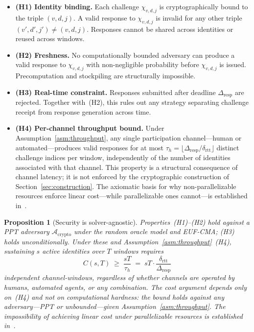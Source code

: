 \documentclass[11pt]{article}
\newtheorem{proposition}{Proposition}
\theoremstyle{remark}
\theoremstyle{plain}
\begin{document}
	\begin{itemize}
		\item \textbf{(H1) Identity binding.} Each challenge $\chi_{v,d,j}$
		is cryptographically bound to the triple $(v,d,j)$. A valid response
		to $\chi_{v,d,j}$ is invalid for any other triple
		$(v',d',j') \neq (v,d,j)$. Responses cannot be shared across
		identities or reused across windows.
		
		\item \textbf{(H2) Freshness.} No computationally bounded adversary
		can produce a valid response to $\chi_{v,d,j}$ with non-negligible
		probability before $\chi_{v,d,j}$ is issued. Precomputation and
		stockpiling are structurally impossible.
		
		\item \textbf{(H3) Real-time constraint.} Responses submitted after
		deadline $\Delta_{\mathrm{resp}}$ are rejected. Together with~(H2),
		this rules out any strategy separating challenge receipt from response
		generation across time.
		
		\item \textbf{(H4) Per-channel throughput bound.}
		Under Assumption~\ref{asm:throughput}, any single participation
		channel---human or automated---produces valid responses for at most
		$\tau_h = \lfloor\Delta_{\mathrm{resp}}/\delta_{\mathrm{rtt}}\rfloor$
		distinct challenge indices per window, independently of the number
		of identities associated with that channel. This property is a
		structural consequence of channel latency; it is not enforced by
		the cryptographic construction of Section~\ref{sec:construction}.
		The axiomatic basis for why non-parallelizable resources enforce
		linear cost---while parallelizable ones cannot---is established
		in~\cite{maleki2026geometry}.
	\end{itemize}
	
	\begin{proposition}[Security is solver-agnostic]
		\label{prop:agnostic}
		Properties~(H1)--(H2) hold against a PPT adversary
		$\mathcal{A}_{\mathrm{crypto}}$ under the random oracle model
		and EUF-CMA; (H3) holds unconditionally. Under these and
		Assumption~\ref{asm:throughput}~(H4), sustaining $s$ active
		identities over $T$ windows requires
		\[
		C(s,T) \;\geq\; \frac{sT}{\tau_h}
		\;=\; sT\cdot\frac{\delta_{\mathrm{rtt}}}{\Delta_{\mathrm{resp}}}
		\]
		independent channel-windows, regardless of whether channels are
		operated by humans, automated agents, or any combination. The
		cost argument depends only on~(H4) and not on computational
		hardness: the bound holds against any adversary---PPT or
		unbounded---given Assumption~\ref{asm:throughput}. The
		impossibility of achieving linear cost under parallelizable
		resources is established in~\cite{maleki2026geometry}.
	\end{proposition}
	
\end{document}

